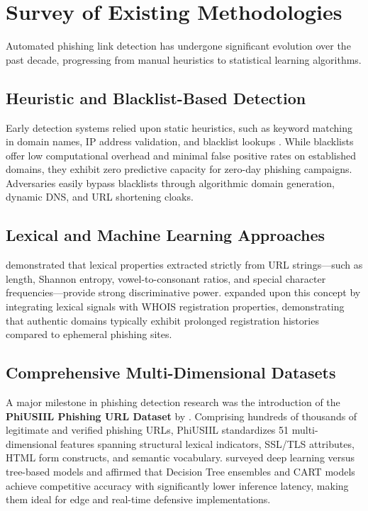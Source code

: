 \documentclass[BTech]{srmuthesis}
\begin{document}
\section{Survey of Existing Methodologies}
Automated phishing link detection has undergone significant evolution over the past decade, progressing from manual heuristics to statistical learning algorithms.

\subsection{Heuristic and Blacklist-Based Detection}
Early detection systems relied upon static heuristics, such as keyword matching in domain names, \ac{IP} address validation, and blacklist lookups \citep{basnet2014mining}. While blacklists offer low computational overhead and minimal false positive rates on established domains, they exhibit zero predictive capacity for zero-day phishing campaigns. Adversaries easily bypass blacklists through algorithmic domain generation, dynamic DNS, and URL shortening cloaks.

\subsection{Lexical and Machine Learning Approaches}
\citet{sahingoz2019machine} demonstrated that lexical properties extracted strictly from URL strings---such as length, Shannon entropy, vowel-to-consonant ratios, and special character frequencies---provide strong discriminative power. \citet{marchal2016know} expanded upon this concept by integrating lexical signals with WHOIS registration properties, demonstrating that authentic domains typically exhibit prolonged registration histories compared to ephemeral phishing sites.

\subsection{Comprehensive Multi-Dimensional Datasets}
A major milestone in phishing detection research was the introduction of the \textbf{PhiUSIIL Phishing URL Dataset} by \citet{prasad2023phiusiil}. Comprising hundreds of thousands of legitimate and verified phishing URLs, PhiUSIIL standardizes 51 multi-dimensional features spanning structural lexical indicators, SSL/TLS attributes, HTML form constructs, and semantic vocabulary. \citet{alshingiti2023hybrid} surveyed deep learning versus tree-based models and affirmed that Decision Tree ensembles and CART models achieve competitive accuracy with significantly lower inference latency, making them ideal for edge and real-time defensive implementations.
\end{document}
